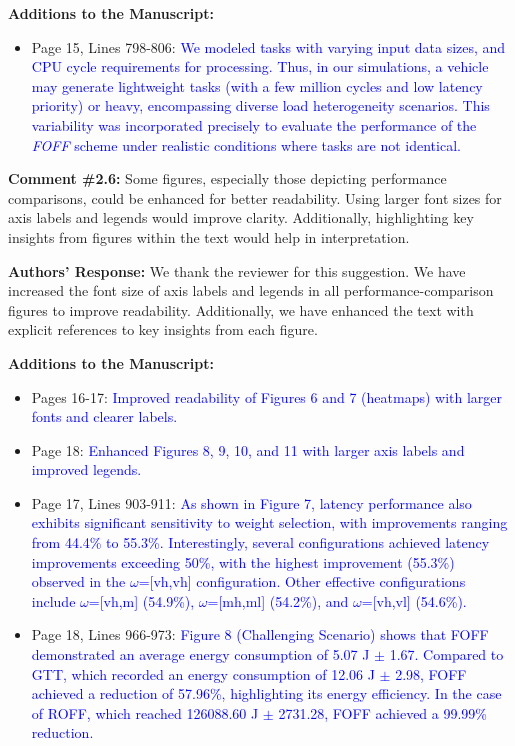 \textbf{Additions to the Manuscript:} 

\begin{itemize}
    \item Page 15, Lines 798-806: \textcolor{blue}{We modeled tasks with varying input data sizes, and CPU cycle requirements for processing. Thus, in our simulations, a vehicle may generate lightweight tasks (with a few million cycles and low latency priority) or heavy, encompassing diverse load heterogeneity scenarios. This variability was incorporated precisely to evaluate the performance of the \emph{FOFF} scheme under realistic conditions where tasks are not identical.}
\end{itemize}

\vspace{\baselineskip}

\begin{mdframed}[style=review] 
\textbf{Comment \#2.6:} Some figures, especially those depicting performance comparisons, could be enhanced for better readability. Using larger font sizes for axis labels and legends would improve clarity. Additionally, highlighting key insights from figures within the text would help in interpretation.
\end{mdframed}

\textbf{Authors' Response:} 
We thank the reviewer for this suggestion. We have increased the font size of axis labels and legends in all performance-comparison figures to improve readability. Additionally, we have enhanced the text with explicit references to key insights from each figure.

\textbf{Additions to the Manuscript:} 

\begin{itemize}
    \item Pages 16-17: \textcolor{blue}{Improved readability of Figures 6 and 7 (heatmaps) with larger fonts and clearer labels.}
    \item Page 18: \textcolor{blue}{Enhanced Figures 8, 9, 10, and 11 with larger axis labels and improved legends.}
    \item Page 17, Lines 903-911: \textcolor{blue}{As shown in Figure 7, latency performance also exhibits significant sensitivity to weight selection, with improvements ranging from 44.4\% to 55.3\%. Interestingly, several configurations achieved latency improvements exceeding 50\%, with the highest improvement (55.3\%) observed in the $\omega$=[vh,vh] configuration. Other effective configurations include $\omega$=[vh,m] (54.9\%), $\omega$=[mh,ml] (54.2\%), and $\omega$=[vh,vl] (54.6\%).} 
    \item Page 18, Lines 966-973: \textcolor{blue}{Figure 8 (Challenging Scenario) shows that FOFF demonstrated an average energy consumption of 5.07 J $\pm$ 1.67. Compared to GTT, which recorded an energy consumption of 12.06 J $\pm$ 2.98, FOFF achieved a reduction of 57.96\%, highlighting its energy efficiency. In the case of ROFF, which reached 126088.60 J $\pm$ 2731.28, FOFF achieved a 99.99\% reduction.}
\end{itemize}

